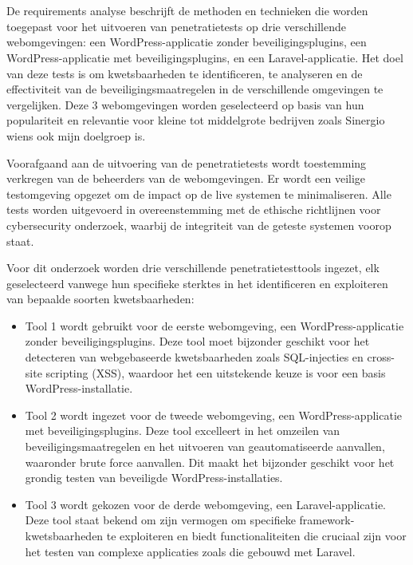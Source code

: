 \section{}
De requirements analyse beschrijft de methoden en technieken die worden toegepast voor het uitvoeren van penetratietests op drie 
verschillende webomgevingen: een WordPress-applicatie zonder beveiligingsplugins, een WordPress-applicatie met 
beveiligingsplugins, en een Laravel-applicatie. Het doel van deze tests is om kwetsbaarheden te identificeren, te 
analyseren en de effectiviteit van de beveiligingsmaatregelen in de verschillende omgevingen te vergelijken.
Deze 3 webomgevingen worden geselecteerd op basis van hun populariteit en relevantie voor kleine tot middelgrote bedrijven 
zoals Sinergio wiens ook mijn doelgroep is.

Voorafgaand aan de uitvoering van de penetratietests wordt toestemming verkregen van de beheerders van de 
webomgevingen. Er wordt een veilige testomgeving opgezet om de impact op de live systemen te minimaliseren. 
Alle tests worden uitgevoerd in overeenstemming met de ethische richtlijnen voor cybersecurity onderzoek, 
waarbij de integriteit van de geteste systemen voorop staat.

Voor dit onderzoek worden drie verschillende penetratietesttools ingezet, elk geselecteerd vanwege hun 
specifieke sterktes in het identificeren en exploiteren van bepaalde soorten kwetsbaarheden:

\begin{itemize}
    \item Tool 1 wordt gebruikt voor de eerste webomgeving, een WordPress-applicatie zonder 
    beveiligingsplugins. Deze tool moet bijzonder geschikt voor het detecteren van webgebaseerde kwetsbaarheden 
    zoals SQL-injecties en cross-site scripting (XSS), waardoor het een uitstekende keuze is voor 
    een basis WordPress-installatie.
    \item Tool 2 wordt ingezet voor de tweede webomgeving, een WordPress-applicatie met beveiligingsplugins. 
    Deze tool excelleert in het omzeilen van beveiligingsmaatregelen en het uitvoeren van geautomatiseerde 
    aanvallen, waaronder brute force aanvallen. Dit maakt het bijzonder geschikt voor het grondig 
    testen van beveiligde WordPress-installaties.
    \item Tool 3 wordt gekozen voor de derde webomgeving, een Laravel-applicatie. Deze tool staat 
    bekend om zijn vermogen om specifieke framework-kwetsbaarheden te exploiteren en biedt functionaliteiten 
    die cruciaal zijn voor het testen van complexe applicaties zoals die gebouwd met Laravel.
\end{itemize}

